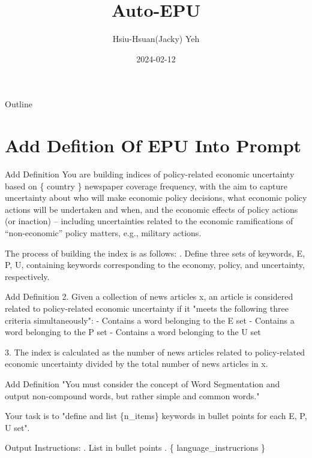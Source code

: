 \documentclass[11.5pt]{beamer}
\title{\huge{Auto-EPU}}
\author{Hsiu-Hsuan(Jacky) Yeh}
\date{2024-02-12}
\begin{document}
\maketitle


\begin{frame}{Outline}
\tableofcontents
\end{frame}


\section{Add Defition Of EPU Into Prompt}


\begin{frame}{Add Definition}
You are building indices of policy-related economic uncertainty based on
\{ country \} newspaper coverage frequency, with the aim to capture
uncertainty about who will make economic policy decisions, what economic policy
actions will be undertaken and when, and the economic effects of policy actions
(or inaction) – including uncertainties related to the economic ramifications
of “non-economic” policy matters, e.g., military actions. \newline

The process of building the index is as follows: . Define three sets of keywords, E, P, U, containing keywords
    corresponding to the economy, policy, and uncertainty, respectively.
\end{frame}


\begin{frame}{Add Definition}
2. Given a collection of news articles x, an article is considered related to
    policy-related economic uncertainty if it "meets the following three
    criteria simultaneously": \newline
- Contains a word belonging to the E set \newline
- Contains a word belonging to the P set \newline
- Contains a word belonging to the U set \newline

3. The index is calculated as the number of news articles related to
    policy-related economic uncertainty divided by the total number of news
    articles in x. \newline
\end{frame}


\begin{frame}{Add Definition}
"You must consider the concept of Word Segmentation and output non-compound
words, but rather simple and common words." \newline

Your task is to "define and list \{n\_items\} keywords in bullet points for
each E, P, U set". \newline

Output Instructions: . List in bullet points . \{ language\_instrucrions \}
\end{frame}
\end{document}
